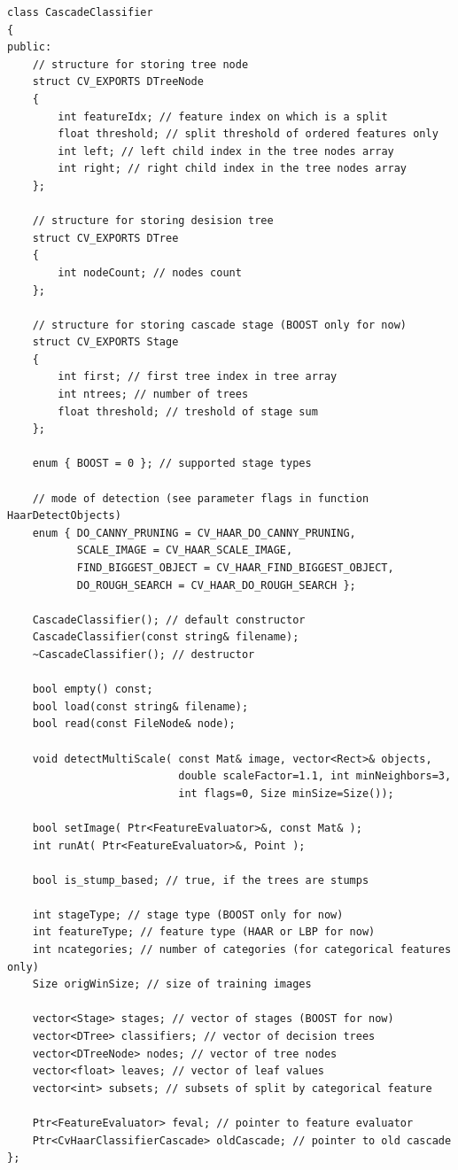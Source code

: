 \begin{lstlisting}
class CascadeClassifier
{
public:
	// structure for storing tree node
    struct CV_EXPORTS DTreeNode 
    {
        int featureIdx; // feature index on which is a split
        float threshold; // split threshold of ordered features only
        int left; // left child index in the tree nodes array
        int right; // right child index in the tree nodes array
    };
    
    // structure for storing desision tree
    struct CV_EXPORTS DTree 
    {
        int nodeCount; // nodes count
    };
    
    // structure for storing cascade stage (BOOST only for now)
    struct CV_EXPORTS Stage
    {
        int first; // first tree index in tree array
        int ntrees; // number of trees
        float threshold; // treshold of stage sum
    };
    
    enum { BOOST = 0 }; // supported stage types
    
    // mode of detection (see parameter flags in function HaarDetectObjects)
    enum { DO_CANNY_PRUNING = CV_HAAR_DO_CANNY_PRUNING,
           SCALE_IMAGE = CV_HAAR_SCALE_IMAGE,
           FIND_BIGGEST_OBJECT = CV_HAAR_FIND_BIGGEST_OBJECT,
           DO_ROUGH_SEARCH = CV_HAAR_DO_ROUGH_SEARCH }; 

    CascadeClassifier(); // default constructor
    CascadeClassifier(const string& filename);
    ~CascadeClassifier(); // destructor
    
    bool empty() const;
    bool load(const string& filename);
    bool read(const FileNode& node);

    void detectMultiScale( const Mat& image, vector<Rect>& objects, 
                           double scaleFactor=1.1, int minNeighbors=3, 
						   int flags=0, Size minSize=Size());
    
    bool setImage( Ptr<FeatureEvaluator>&, const Mat& );
    int runAt( Ptr<FeatureEvaluator>&, Point );

    bool is_stump_based; // true, if the trees are stumps

    int stageType; // stage type (BOOST only for now)
    int featureType; // feature type (HAAR or LBP for now)
    int ncategories; // number of categories (for categorical features only) 
    Size origWinSize; // size of training images
    
    vector<Stage> stages; // vector of stages (BOOST for now)
    vector<DTree> classifiers; // vector of decision trees
    vector<DTreeNode> nodes; // vector of tree nodes
    vector<float> leaves; // vector of leaf values
    vector<int> subsets; // subsets of split by categorical feature

    Ptr<FeatureEvaluator> feval; // pointer to feature evaluator
    Ptr<CvHaarClassifierCascade> oldCascade; // pointer to old cascade
};
\end{lstlisting}

